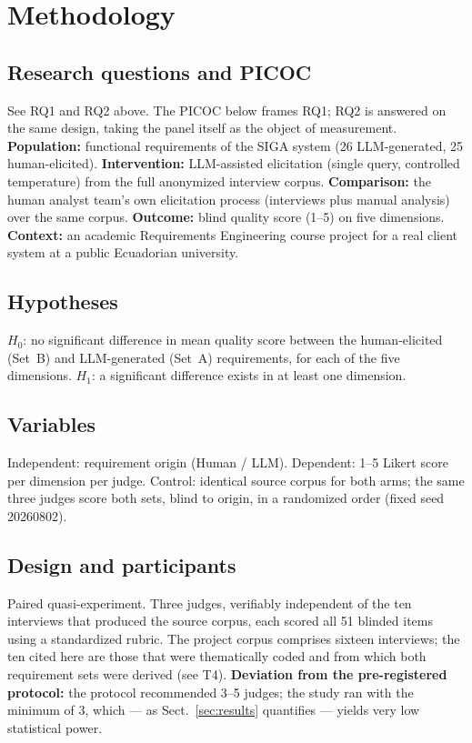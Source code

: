 \documentclass{llncs}
\begin{document}
\section{Methodology}

\subsection{Research questions and PICOC}
See RQ1 and RQ2 above. The PICOC below frames RQ1; RQ2 is answered on the same design,
taking the panel itself as the object of measurement. \textbf{Population:} functional requirements of the SIGA system (26
LLM-generated, 25 human-elicited). \textbf{Intervention:} LLM-assisted elicitation
(single query, controlled temperature) from the full anonymized interview corpus.
\textbf{Comparison:} the human analyst team's own elicitation process (interviews plus
manual analysis) over the same corpus. \textbf{Outcome:} blind quality score (1--5) on
five dimensions. \textbf{Context:} an academic Requirements Engineering course project
for a real client system at a public Ecuadorian university.

\subsection{Hypotheses}
$H_0$: no significant difference in mean quality score between the human-elicited
(Set~B) and LLM-generated (Set~A) requirements, for each of the five dimensions.
$H_1$: a significant difference exists in at least one dimension.

\subsection{Variables}
Independent: requirement origin (Human / LLM). Dependent: 1--5 Likert score per
dimension per judge. Control: identical source corpus for both arms; the same three
judges score both sets, blind to origin, in a randomized order (fixed seed
20260802).

\subsection{Design and participants}
Paired quasi-experiment. Three judges, verifiably independent of the ten interviews
that produced the source corpus, each scored all 51 blinded items using a
standardized rubric. The project corpus comprises sixteen interviews; the ten cited
here are those that were thematically coded and from which both requirement sets were
derived (see T4). \textbf{Deviation from the pre-registered protocol:} the protocol
recommended 3--5 judges; the study ran with the minimum of 3, which --- as
Sect.~\ref{sec:results} quantifies --- yields very low statistical power.
\end{document}
